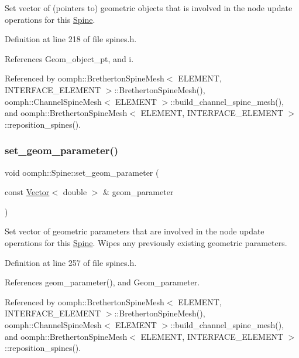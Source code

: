 Set vector of (pointers to) geometric objects that is involved in the node update operations for this \hyperlink{classoomph_1_1Spine}{Spine}. 



Definition at line 218 of file spines.\+h.



References Geom\+\_\+object\+\_\+pt, and i.



Referenced by oomph\+::\+Bretherton\+Spine\+Mesh$<$ E\+L\+E\+M\+E\+N\+T, I\+N\+T\+E\+R\+F\+A\+C\+E\+\_\+\+E\+L\+E\+M\+E\+N\+T $>$\+::\+Bretherton\+Spine\+Mesh(), oomph\+::\+Channel\+Spine\+Mesh$<$ E\+L\+E\+M\+E\+N\+T $>$\+::build\+\_\+channel\+\_\+spine\+\_\+mesh(), and oomph\+::\+Bretherton\+Spine\+Mesh$<$ E\+L\+E\+M\+E\+N\+T, I\+N\+T\+E\+R\+F\+A\+C\+E\+\_\+\+E\+L\+E\+M\+E\+N\+T $>$\+::reposition\+\_\+spines().

\mbox{\label{classoomph_1_1Spine_a6d99d5a44a79588d38a83fae4ca87c57}} 
\subsubsection{\texorpdfstring{set\+\_\+geom\+\_\+parameter()}{set\_geom\_parameter()}}
{\footnotesize\ttfamily void oomph\+::\+Spine\+::set\+\_\+geom\+\_\+parameter (\begin{DoxyParamCaption}\item[{const \hyperlink{classoomph_1_1Vector}{Vector}$<$ double $>$ \&}]{geom\+\_\+parameter }\end{DoxyParamCaption})\hspace{0.3cm}{\ttfamily [inline]}}



Set vector of geometric parameters that are involved in the node update operations for this \hyperlink{classoomph_1_1Spine}{Spine}. Wipes any previously existing geometric parameters. 



Definition at line 257 of file spines.\+h.



References geom\+\_\+parameter(), and Geom\+\_\+parameter.



Referenced by oomph\+::\+Bretherton\+Spine\+Mesh$<$ E\+L\+E\+M\+E\+N\+T, I\+N\+T\+E\+R\+F\+A\+C\+E\+\_\+\+E\+L\+E\+M\+E\+N\+T $>$\+::\+Bretherton\+Spine\+Mesh(), oomph\+::\+Channel\+Spine\+Mesh$<$ E\+L\+E\+M\+E\+N\+T $>$\+::build\+\_\+channel\+\_\+spine\+\_\+mesh(), and oomph\+::\+Bretherton\+Spine\+Mesh$<$ E\+L\+E\+M\+E\+N\+T, I\+N\+T\+E\+R\+F\+A\+C\+E\+\_\+\+E\+L\+E\+M\+E\+N\+T $>$\+::reposition\+\_\+spines().


